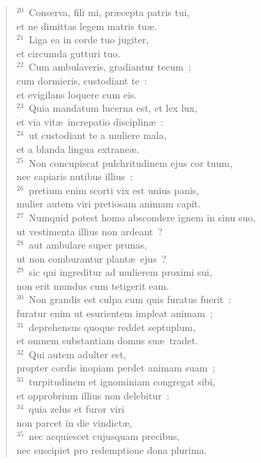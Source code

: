 \begin{flushleft}\begin{verse}${}^{20}$~Conserva, fili mi, pr\ae cepta patris tui,\\ et ne dimittas legem matris tu\ae .\\
${}^{21}$~Liga ea in corde tuo jugiter,\\ et circumda gutturi tuo.\\
${}^{22}$~Cum ambulaveris, gradiantur tecum~;\\ cum dormieris, custodiant te~:\\ et evigilans loquere cum eis.\\
${}^{23}$~Quia mandatum lucerna est, et lex lux,\\ et via vit\ae\ increpatio disciplin\ae~:\\
${}^{24}$~ut custodiant te a muliere mala,\\ et a blanda lingua extrane\ae .\\
${}^{25}$~Non concupiscat pulchritudinem ejus cor tuum,\\ nec capiaris nutibus illius~:\\
${}^{26}$~pretium enim scorti vix est unius panis,\\ mulier autem viri pretiosam animam capit.\\
${}^{27}$~Numquid potest homo abscondere ignem in sinu suo,\\ ut vestimenta illius non ardeant~?\\
${}^{28}$~aut ambulare super prunas,\\ ut non comburantur plant\ae\ ejus~?\\
${}^{29}$~sic qui ingreditur ad mulierem proximi sui,\\ non erit mundus cum tetigerit eam.\\
${}^{30}$~Non grandis est culpa cum quis furatus fuerit~:\\ furatur enim ut esurientem impleat animam~;\\
${}^{31}$~deprehensus quoque reddet septuplum,\\ et omnem substantiam domus su\ae\ tradet.\\
${}^{32}$~Qui autem adulter est,\\ propter cordis inopiam perdet animam suam~;\\
${}^{33}$~turpitudinem et ignominiam congregat sibi,\\ et opprobrium illius non delebitur~:\\
${}^{34}$~quia zelus et furor viri\\ non parcet in die vindict\ae ,\\
${}^{35}$~nec acquiescet cujusquam precibus,\\ nec suscipiet pro redemptione dona plurima.\end{verse}\end{flushleft}


